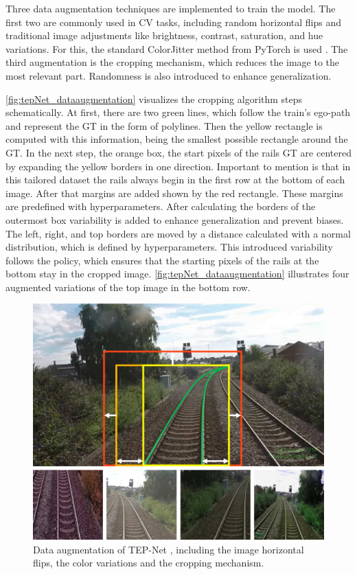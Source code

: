 Three data augmentation techniques are implemented to train the model.
The first two are commonly used in CV tasks, including random horizontal flips and traditional image adjustments like brightness, contrast, saturation, and hue variations.
For this, the standard ColorJitter method from PyTorch is used \cite{pytorch_colorJitter_docu}.
The third augmentation is the cropping mechanism, which reduces the image to the most relevant part.
Randomness is also introduced to enhance generalization.

\autoref{fig:tepNet_dataaugmentation} visualizes the cropping algorithm steps schematically.
At first, there are two green lines, which follow the train's ego-path and represent the \ac{GT} in the form of polylines.
Then the yellow rectangle is computed with this information, being the smallest possible rectangle around the \ac{GT}.
In the next step, the orange box, the start pixels of the rails \ac{GT} are centered by expanding the yellow borders in one direction.
Important to mention is that in this tailored dataset the rails always begin in the first row at the bottom of each image.
After that margins are added shown by the red rectangle.
These margins are predefined with hyperparameters.
After calculating the borders of the outermost box variability is added to enhance generalization and prevent biases.
The left, right, and top borders are moved by a distance calculated with a normal distribution, which is defined by hyperparameters.
This introduced variability follows the policy, which ensures that the starting pixels of the rails at the bottom stay in the cropped image.
\autoref{fig:tepNet_dataaugmentation} illustrates four augmented variations of the top image in the bottom row.

\begin{figure}[H]
    \centering
    \includegraphics[width=\linewidth]{PICs/Baselinepaper/data_augmenation.jpg}
    \caption{Data augmentation of \ac{TEP}-Net \cite{tepNet2024}, including the image horizontal flips, the color variations and the cropping mechanism.}
    \label{fig:tepNet_dataaugmentation}
\end{figure}

